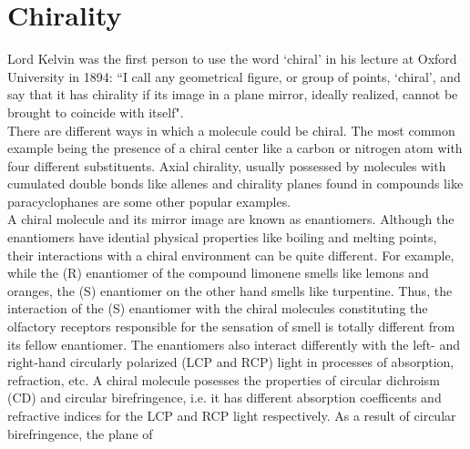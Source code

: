 
\section{Chirality}
Lord Kelvin was the first person to use the word `chiral' in his lecture 
at Oxford University in 1894: ``I call any geometrical figure, or group of points, 
`chiral', and say that it has chirality if its image in a plane mirror, ideally realized, 
cannot be brought to coincide with itself"\cite{Kelvin}. 
\\
There are different ways in which a molecule 
could be chiral. The most common example being the presence of a chiral center 
like a carbon or nitrogen atom with four different substituents. Axial chirality, usually 
possessed by molecules with cumulated double bonds like allenes and chirality planes 
found in compounds like paracyclophanes are some other popular examples. \\
A chiral molecule and its mirror image are known as enantiomers. Although the
enantiomers have idential physical properties like boiling and melting points, their
interactions with a chiral environment can be quite different. For example,
while the (R) enantiomer of the compound limonene smells like lemons and oranges, the (S) 
enantiomer on the other hand smells like turpentine. Thus, the interaction of the (S) enantiomer 
with the chiral molecules constituting the olfactory receptors responsible for the sensation of smell 
is totally different from its fellow enantiomer. The enantiomers also interact differently with 
the left- and right-hand circularly polarized (LCP and RCP) light in processes of absorption, 
refraction, etc. A chiral molecule posesses the properties of circular dichroism (CD) and 
circular birefringence, i.e. it has different absorption coefficents and refractive indices 
for the LCP and RCP light respectively. As a result of circular birefringence, the plane of 
